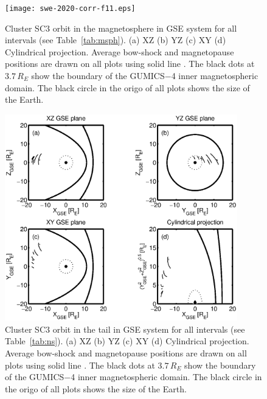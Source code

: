 \documentclass[linenumbers,draft]{agujournal}
\begin{document}
\pagebreak

\begin{figure}[h]
\centering
\texttt{[image: swe-2020-corr-f11.eps]}  
\caption{Cluster SC3 orbit in the magnetosphere in GSE system for all intervals (see Table~\ref{tab:msph}). (a) XZ (b) YZ (c) XY (d) Cylindrical projection. Average bow-shock and magnetopause positions are drawn on all plots using solid line \citep[][respectively]{peredo95:_three_alfven_mach,tsyganenko95:_model_earth}. The black dots at $3.7\,R_E$ show the boundary of the GUMICS$-$4 inner magnetospheric domain. The black circle in the origo of all plots shows the size of the Earth.}
\label{fig:msphorbit}
\end{figure}

\pagebreak

\begin{figure}[h]
\centering
\includegraphics[width=0.9\textwidth,angle=0]{swe-2020-corr-f12.eps}  
\caption{Cluster SC3 orbit in the tail in GSE system for all intervals (see Table~\ref{tab:ns}). (a) XZ (b) YZ (c) XY (d) Cylindrical projection. Average bow-shock and magnetopause positions are drawn on all plots using solid line \citep[][respectively]{peredo95:_three_alfven_mach,tsyganenko95:_model_earth}. The black dots at $3.7\,R_E$ show the boundary of the GUMICS$-$4 inner magnetospheric domain. The black circle in the origo of all plots shows the size of the Earth.}
\label{fig:nsorbit}
\end{figure}

\pagebreak
\end{document}
